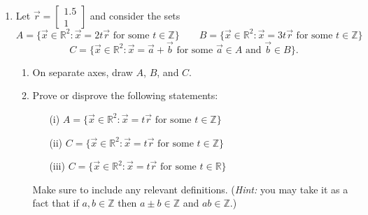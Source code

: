 \documentclass[letter]{article}
\newcommand{\R}{\mathbb{R}}
\newcommand{\Z}{\mathbb{Z}}
\newcommand{\mat}[1]{\begin{bmatrix}#1\end{bmatrix}}
\begin{document}
\begin{enumerate}
		\item Let $\vec r=\mat{1.5\\1}$ and consider the sets
		\[
			A=\{\vec x\in\R^2:\vec x=2t\vec r\text{ for some }t\in\Z\}
			\qquad
			B=\{\vec x\in\R^2:\vec x=3t\vec r\text{ for some }t\in\Z\}
		\]
		\[
			C=\{\vec x\in\R^2:\vec x=\vec a+\vec b\text{ for some }\vec a\in A\text{ and }\vec b\in B\}.
		\]
		\begin{enumerate}
			\item On separate axes, draw $A$, $B$, and $C$.
			\item Prove or disprove the following statements:
			\begin{enumerate}
				\item[(i)] $A=\{\vec x\in\R^2:\vec x=t\vec r\text{ for some }t\in\Z\}$
				\item[(ii)] $C=\{\vec x\in\R^2:\vec x=t\vec r\text{ for some }t\in\Z\}$
				\item[(iii)] $C=\{\vec x\in\R^2:\vec x=t\vec r\text{ for some }t\in\R\}$
			\end{enumerate}
			Make sure to include any relevant definitions. (\emph{Hint:} you may take
			it as a fact that if $a,b\in \Z$ then $a\pm b\in\Z$ and $ab\in \Z$.)
		\end{enumerate}
	\end{enumerate}
\end{document}
